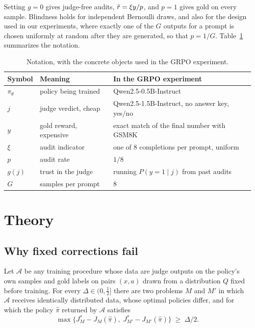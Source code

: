 Setting $g=0$ gives judge-free audits, $\tilde r=\xi y/p$, and $p=1$ gives gold on every sample. Blindness holds for independent Bernoulli draws, and also for the design used in our experiments, where exactly one of the $G$ outputs for a prompt is chosen uniformly at random after they are generated, so that $p=1/G$. Table~\ref{tab:notation} summarizes the notation.

\begin{table}[t]
\centering
\small
\caption{Notation, with the concrete objects used in the GRPO experiment.}
\label{tab:notation}
\begin{tabular}{@{}lll@{}}
\toprule
Symbol & Meaning & In the GRPO experiment \\
\midrule
$\pi_\theta$ & policy being trained & Qwen2.5-0.5B-Instruct \\
$j$ & judge verdict, cheap & Qwen2.5-1.5B-Instruct, no answer key, yes/no \\
$y$ & gold reward, expensive & exact match of the final number with GSM8K \\
$\xi$ & audit indicator & one of 8 completions per prompt, uniform \\
$p$ & audit rate & $1/8$ \\
$g(j)$ & trust in the judge & running $P(y=1\mid j)$ from past audits \\
$G$ & samples per prompt & 8 \\
\bottomrule
\end{tabular}
\end{table}

\section{Theory}
\label{sec:theory}

\subsection{Why fixed corrections fail}

\begin{proposition}
\label{prop:impossible}
Let $\mathcal A$ be any training procedure whose data are judge outputs on the policy's own samples and gold labels on pairs $(x,a)$ drawn from a distribution $Q$ fixed before training. For every $\Delta\in(0,\tfrac12]$ there are two problems $M$ and $M'$ in which $\mathcal A$ receives identically distributed data, whose optimal policies differ, and for which the policy $\hat\pi$ returned by $\mathcal A$ satisfies
\[
\max\bigl\{J^*_M-J_M(\hat\pi),\;J^*_{M'}-J_{M'}(\hat\pi)\bigr\}\;\ge\;\Delta/2 .
\]
\end{proposition}

